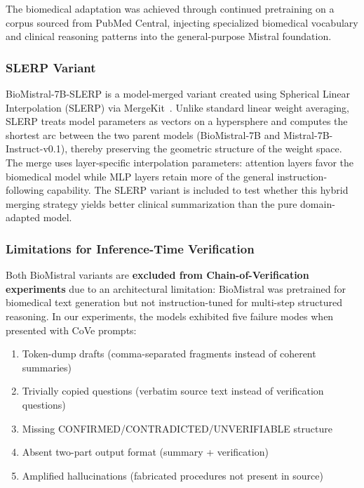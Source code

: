 \documentclass[12pt,a4paper,oneside]{report}
\begin{document}
The biomedical adaptation was achieved through continued pretraining on a corpus sourced from PubMed Central, injecting specialized biomedical vocabulary and clinical reasoning patterns into the general-purpose Mistral foundation.

\subsubsection{SLERP Variant}

BioMistral-7B-SLERP is a model-merged variant created using Spherical Linear Interpolation (SLERP) via MergeKit~\cite{labrak2024biomistral}. Unlike standard linear weight averaging, SLERP treats model parameters as vectors on a hypersphere and computes the shortest arc between the two parent models (BioMistral-7B and Mistral-7B-Instruct-v0.1), thereby preserving the geometric structure of the weight space. The merge uses layer-specific interpolation parameters: attention layers favor the biomedical model while MLP layers retain more of the general instruction-following capability. The SLERP variant is included to test whether this hybrid merging strategy yields better clinical summarization than the pure domain-adapted model.

\subsubsection{Limitations for Inference-Time Verification}

Both BioMistral variants are \textbf{excluded from Chain-of-Verification experiments} due to an architectural limitation: BioMistral was pretrained for biomedical text generation but not instruction-tuned for multi-step structured reasoning. In our experiments, the models exhibited five failure modes when presented with CoVe prompts:

\begin{enumerate}
    \item Token-dump drafts (comma-separated fragments instead of coherent summaries)
    \item Trivially copied questions (verbatim source text instead of verification questions)
    \item Missing CONFIRMED/CONTRADICTED/UNVERIFIABLE structure
    \item Absent two-part output format (summary + verification)
    \item Amplified hallucinations (fabricated procedures not present in source)
\end{enumerate}
\end{document}
